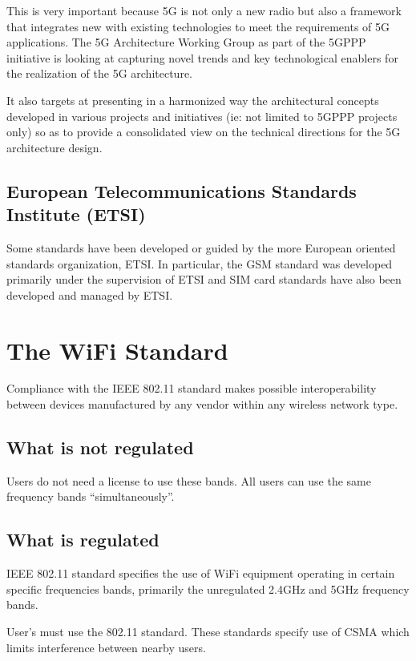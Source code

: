 This is very important because 5G is not only a new radio but also a
framework that integrates new with existing technologies to meet the
requirements of 5G applications. The 5G Architecture Working Group as
part of the 5GPPP initiative is looking at capturing novel trends and
key technological enablers for the realization of the 5G architecture.

It also targets at presenting in a harmonized way the architectural
concepts developed in various projects and initiatives (ie: not limited
to 5GPPP projects only) so as to provide a consolidated view on the
technical directions for the 5G architecture design.

\subsection{European Telecommunications Standards Institute (ETSI)}
\label{ETSI}

Some standards have been developed or guided by the more European
oriented standards organization, ETSI. In particular, the GSM \cite{GSM}
standard was developed primarily under the supervision of ETSI and
SIM card standards have also been developed and managed by ETSI.

\section{The WiFi Standard}

Compliance with the IEEE 802.11 standard \cite{ieee802_11standard}
makes possible interoperability between devices manufactured by any
vendor within any wireless network type.

\subsection{What is not regulated}
Users do not need a license to use these bands.
All users can use the same frequency bands ``simultaneously''.

\subsection{What is regulated}
IEEE 802.11 standard specifies the use of WiFi equipment operating
in certain specific frequencies bands, primarily the unregulated 2.4GHz and
5GHz frequency bands.  

User's must use the 802.11 standard.  These standards specify use of CSMA which
limits interference between nearby users.

